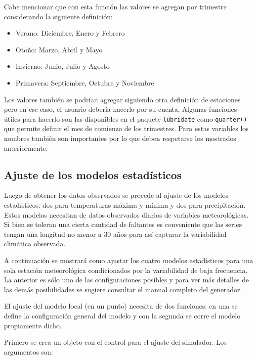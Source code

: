 \documentclass[
]{article}
\providecommand{\tightlist}{%
  \setlength{\itemsep}{0pt}\setlength{\parskip}{0pt}}
\begin{document}
Cabe mencionar que con esta función las valores se agregan por trimestre considerando la siguiente definición:

\begin{itemize}
\tightlist
\item
  Verano: Diciembre, Enero y Febrero
\item
  Otoño: Marzo, Abril y Mayo
\item
  Invierno: Junio, Julio y Agosto
\item
  Primavera: Septiembre, Octubre y Noviembre
\end{itemize}

Los valores también se podrían agregar siguiendo otra definición de estaciones pero en ese caso, el usuario debería hacerlo por su cuenta. Algunas funciones útiles para hacerlo son las disponibles en el paquete \texttt{lubridate} como \texttt{quarter()} que permite definir el mes de comienzo de los trimestres.
Para estas variables los nombres también son importantes por lo que deben respetarse los mostrados anteriormente.

\hypertarget{ajuste-de-los-modelos-estaduxedsticos}{%
\subsection{Ajuste de los modelos estadísticos}\label{ajuste-de-los-modelos-estaduxedsticos}}

Luego de obtener los datos observados se procede al ajuste de los modelos estadísticos: dos para temperaturas máxima y mínima y dos para precipitación. Estos modelos necesitan de datos observados diarios de variables meteorológicas. Si bien se toleran una cierta cantidad de faltantes es conveniente que las series tengan una longitud no menor a 30 años para así capturar la variabilidad climática observada.

A continuación se mostrará como ajustar los cuatro modelos estadísticos para una sola estación meteorológica condicionados por la variabilidad de baja frecuencia. La anterior es sólo uno de las configuraciones posibles y para ver más detalles de las demás posibilidades se sugiere consultar el manual completo del generador.

El ajuste del modelo local (en un punto) necesita de dos funciones: en una se define la configuración general del modelo y con la segunda se corre el modelo propiamente dicho.

Primero se crea un objeto con el control para el ajuste del simulador. Los argumentos son:
\end{document}
